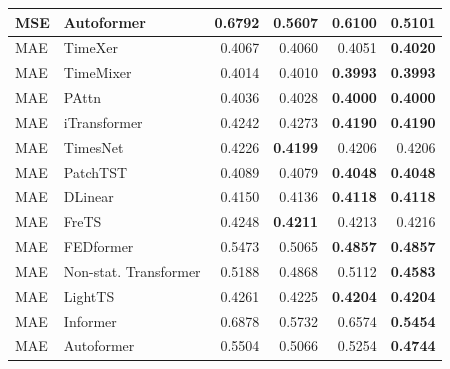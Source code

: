 \begin{longtable}{llrrrr}
MSE & Autoformer & 0.6792 & 0.5607 & 0.6100 & \textbf{0.5101} \\
\midrule
MAE & TimeXer & 0.4067 & 0.4060 & 0.4051 & \textbf{0.4020} \\
MAE & TimeMixer & 0.4014 & 0.4010 & \textbf{0.3993} & \textbf{0.3993} \\
MAE & PAttn & 0.4036 & 0.4028 & \textbf{0.4000} & \textbf{0.4000} \\
MAE & iTransformer & 0.4242 & 0.4273 & \textbf{0.4190} & \textbf{0.4190} \\
MAE & TimesNet & 0.4226 & \textbf{0.4199} & 0.4206 & 0.4206 \\
MAE & PatchTST & 0.4089 & 0.4079 & \textbf{0.4048} & \textbf{0.4048} \\
MAE & DLinear & 0.4150 & 0.4136 & \textbf{0.4118} & \textbf{0.4118} \\
MAE & FreTS & 0.4248 & \textbf{0.4211} & 0.4213 & 0.4216 \\
MAE & FEDformer & 0.5473 & 0.5065 & \textbf{0.4857} & \textbf{0.4857} \\
MAE & Non-stat. Transformer & 0.5188 & 0.4868 & 0.5112 & \textbf{0.4583} \\
MAE & LightTS & 0.4261 & 0.4225 & \textbf{0.4204} & \textbf{0.4204} \\
MAE & Informer & 0.6878 & 0.5732 & 0.6574 & \textbf{0.5454} \\
MAE & Autoformer & 0.5504 & 0.5066 & 0.5254 & \textbf{0.4744} \\
\end{longtable}
\endgroup

